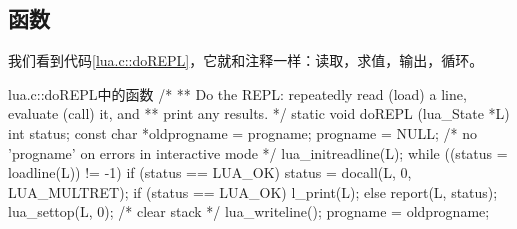 \subsection{函数}

我们看到代码\ref{lua.c::doREPL}，它就和注释一样：读取，求值，输出，循环。

\begin{ccode}{lua.c::doREPL}{中的函数}
/*
** Do the REPL: repeatedly read (load) a line, evaluate (call) it, and
** print any results.
*/
static void doREPL (lua_State *L) {
  int status;
  const char *oldprogname = progname;
  progname = NULL;  /* no 'progname' on errors in interactive mode */
  lua_initreadline(L);
  while ((status = loadline(L)) != -1) {
    if (status == LUA_OK)
      status = docall(L, 0, LUA_MULTRET);
    if (status == LUA_OK) l_print(L);
    else report(L, status);
  }
  lua_settop(L, 0);  /* clear stack */
  lua_writeline();
  progname = oldprogname;
}
\end{ccode}


